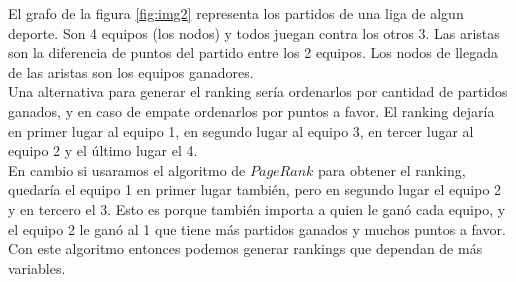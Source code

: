El grafo de la figura \ref{fig:img2} representa los partidos de una liga de algun deporte. Son 4 equipos (los nodos) y todos juegan contra los otros 3. Las aristas son la diferencia de puntos del partido entre los 2 equipos. Los nodos de llegada de las aristas son los equipos ganadores.\\

Una alternativa para generar el ranking sería ordenarlos por cantidad de partidos ganados, y en caso de empate ordenarlos por puntos a favor. El ranking dejaría en primer lugar al equipo 1, en segundo lugar al equipo 3, en tercer lugar al equipo 2 y el último lugar el 4.\\

En cambio si usaramos el algoritmo de $PageRank$ para obtener el ranking, quedaría el equipo 1 en primer lugar también, pero en segundo lugar el equipo 2 y en tercero el 3. Esto es porque también importa a quien le ganó cada equipo, y el equipo 2 le ganó al 1 que tiene más partidos ganados y muchos puntos a favor. Con este algoritmo entonces podemos generar rankings que dependan de más variables.\\






